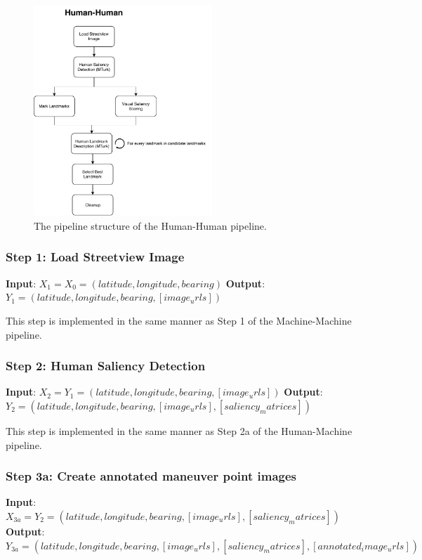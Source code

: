\begin{figure}[htbp]
  \centering
  \includegraphics[width=0.6\textwidth]{pipeline_diagrams/human-human.pdf}
  \caption{The pipeline structure of the Human-Human pipeline.}
  \label{fig:pipeline:hh}
\end{figure}

\subsubsection*{Step 1: Load Streetview Image}
\textbf{Input}: $X_1 = X_0 = (latitude, longitude, bearing)$
\textbf{Output}: $Y_1 = (latitude, longitude, bearing, [image_urls])$

This step is implemented in the same manner as Step 1 of the Machine-Machine pipeline.

\subsubsection*{Step 2: Human Saliency Detection} 
\textbf{Input}: $X_{2} = Y_1 = (latitude, longitude, bearing, [image_urls])$
\textbf{Output}: $Y_{2} = (latitude, longitude, bearing, [image_urls], [saliency_matrices])$ 

This step is implemented in the same manner as Step 2a of the Human-Machine pipeline.

\subsubsection*{Step 3a: Create annotated maneuver point images}
\textbf{Input}: $X_{3a} = Y_2 = (latitude, longitude, bearing, [image_urls], [saliency_matrices])$ 
\textbf{Output}: $Y_{3a} = (latitude, longitude, bearing, [image_urls], [saliency_matrices], [annotated_image_urls])$ 

